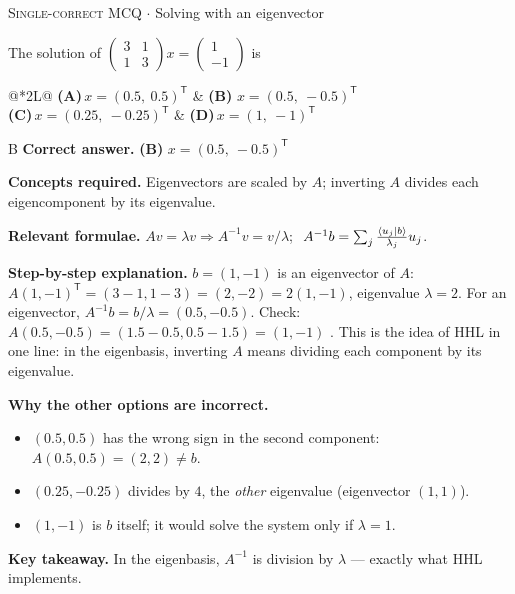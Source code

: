 \documentclass[11pt,a4paper]{article}
\newcommand{\optlabel}[1]{\textbf{(#1)}}
\newcommand{\correctlabel}[1]{\textcolor{okgreen}{\textbf{(#1)}\,\ding{51}}}
\newenvironment{qitem}[1]{\begin{list}{}{\setlength{\leftmargin}{3.3em}\setlength{\labelwidth}{3.1em}%
  \setlength{\labelsep}{0.2em}\setlength{\topsep}{3pt}\setlength{\parsep}{3pt}}\item[\textbf{Q.#1}\hfill]}{\end{list}}
\newcommand{\qsep}{\par\vspace{2pt}{\color{black!15}\hrule}\vspace{4pt}}
\newcommand{\qmeta}[2]{{\footnotesize\color{black!60}\textsc{#1} \;$\cdot$\; #2}\par}
\begin{document}
\begin{qitem}{1}
\qmeta{Single-correct MCQ}{Solving with an eigenvector}
The solution of $\begin{pmatrix}3 & 1\\ 1 & 3\end{pmatrix}x = \begin{pmatrix}1\\ -1\end{pmatrix}$ is
\par\smallskip\noindent\begin{tabularx}{\linewidth}{@{}*{2}{L}@{}}
\optlabel{A}\,$x = (0.5,\ 0.5)^{\mathsf T}$ & \correctlabel{B}\,$x = (0.5,\ -0.5)^{\mathsf T}$ \\[3pt]
\optlabel{C}\,$x = (0.25,\ -0.25)^{\mathsf T}$ & \optlabel{D}\,$x = (1,\ -1)^{\mathsf T}$
\end{tabularx}
\end{qitem}
\begin{solbox}{B}
\textbf{\color{brand}Correct answer.} \textcolor{okgreen}{\textbf{(B)}} $x = (0.5,\ -0.5)^{\mathsf T}$

\textbf{\color{brand}Concepts required.} Eigenvectors are scaled by $A$; inverting $A$ divides each eigencomponent by its eigenvalue.

\textbf{\color{brand}Relevant formulae.} $Av = \lambda v \Rightarrow A^{-1}v = v/\lambda$; $\ A^{-1}b = \sum_j\frac{\braket{u_j|b}}{\lambda_j}u_j$.

\textbf{\color{brand}Step-by-step explanation.} $b = (1, -1)$ is an eigenvector of $A$: $A(1, -1)^{\mathsf T} = (3 - 1, 1 - 3) = (2, -2) = 2(1, -1)$, eigenvalue $\lambda = 2$.
For an eigenvector, $A^{-1}b = b/\lambda = (0.5, -0.5)$. Check: $A(0.5, -0.5) = (1.5 - 0.5, 0.5 - 1.5) = (1, -1)$ \checkmark.
This is the idea of HHL in one line: in the eigenbasis, inverting $A$ means dividing each component by its eigenvalue.

\textbf{\color{brand}Why the other options are incorrect.}
\begin{itemize}[leftmargin=2.4em, itemsep=1pt, topsep=2pt]
\item[\textbf{(A)}] $(0.5, 0.5)$ has the wrong sign in the second component: $A(0.5, 0.5) = (2, 2) \ne b$.
\item[\textbf{(C)}] $(0.25, -0.25)$ divides by $4$, the \emph{other} eigenvalue (eigenvector $(1, 1)$).
\item[\textbf{(D)}] $(1, -1)$ is $b$ itself; it would solve the system only if $\lambda = 1$.
\end{itemize}
\textbf{\color{brand}Key takeaway.} In the eigenbasis, $A^{-1}$ is division by $\lambda$ --- exactly what HHL implements.
\end{solbox}
\qsep
\end{document}

